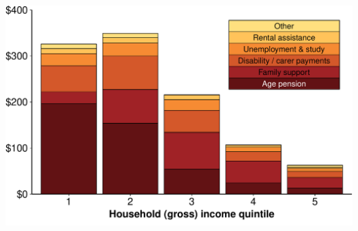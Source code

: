 \documentclass[a4paper,landscape]{article}\usepackage[]{graphicx}\usepackage[]{color}
\newenvironment{knitrout}{}{} %
\begin{document}
\begin{knitrout}
\color{fgcolor}
\includegraphics[width=11.000in,height=7.00in]{figure/GST-Figure-6-1} 

\end{knitrout}
\end{document}
